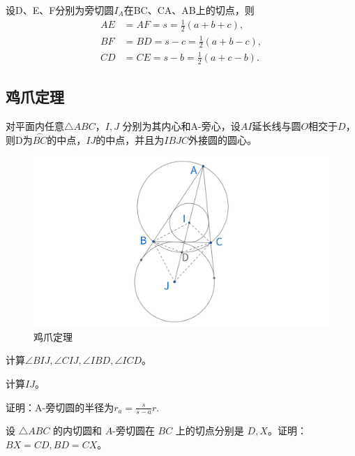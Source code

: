\begin{proposition}[切线长性质]
    设D、E、F分别为旁切圆$I_A$在BC、CA、AB上的切点，则
    $$
    \begin{aligned}
    AE&=AF= s = \frac{1}{2}(a+b+c),\\
    BF&=BD=s - c =\frac{1}{2}(a+b-c),\\
    CD&=CE=s - b= \frac{1}{2}(a+c-b).
    \end{aligned}
    $$
\end{proposition}


\newpage 
\subsection{鸡爪定理}
\begin{theorem}[鸡爪定理]
    对平面内任意$\triangle ABC$，$I,J$ 分别为其内心和A-旁心，设$AI$延长线与圆$O$相交于$D$，则D为$\overset{{\frown}}{BC}$的中点，$IJ$的中点，并且为$IBJC$外接圆的圆心。
\end{theorem}

\begin{figure}[H]
    \centering
    \includegraphics[width=\linewidth]{figures/三角形五心/鸡爪定理2.png}
    \caption{鸡爪定理}
\end{figure}

\begin{exercise}
    计算$\angle BIJ, \angle CIJ, \angle IBD, \angle ICD$。
\end{exercise}
\begin{exercise}
    计算$IJ$。
\end{exercise}
\begin{exercise}[旁切圆半径]
    证明：A-旁切圆的半径为$r_a = \frac{s}{s-a}r.$
\end{exercise}


\begin{exercise}
    设 $\triangle ABC$ 的内切圆和 $A$-旁切圆在 $BC$ 上的切点分别是 $D, X$。证明：$BX = CD, BD = CX$。
\end{exercise}



